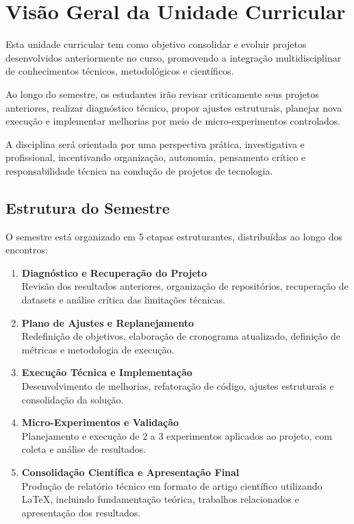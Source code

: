 \section{Visão Geral da Unidade Curricular}

Esta unidade curricular tem como objetivo consolidar e evoluir projetos desenvolvidos anteriormente no curso, promovendo a integração multidisciplinar de conhecimentos técnicos, metodológicos e científicos.

Ao longo do semestre, os estudantes irão revisar criticamente seus projetos anteriores, realizar diagnóstico técnico, propor ajustes estruturais, planejar nova execução e implementar melhorias por meio de micro-experimentos controlados.

A disciplina será orientada por uma perspectiva prática, investigativa e profissional, incentivando organização, autonomia, pensamento crítico e responsabilidade técnica na condução de projetos de tecnologia.

\subsection*{Estrutura do Semestre}

O semestre está organizado em 5 etapas estruturantes, distribuídas ao longo dos encontros:

\begin{enumerate}
    \item \textbf{Diagnóstico e Recuperação do Projeto} \\
    Revisão dos resultados anteriores, organização de repositórios, recuperação de datasets e análise crítica das limitações técnicas.

    \item \textbf{Plano de Ajustes e Replanejamento} \\
    Redefinição de objetivos, elaboração de cronograma atualizado, definição de métricas e metodologia de execução.

    \item \textbf{Execução Técnica e Implementação} \\
    Desenvolvimento de melhorias, refatoração de código, ajustes estruturais e consolidação da solução.

    \item \textbf{Micro-Experimentos e Validação} \\
    Planejamento e execução de 2 a 3 experimentos aplicados ao projeto, com coleta e análise de resultados.

    \item \textbf{Consolidação Científica e Apresentação Final} \\
    Produção de relatório técnico em formato de artigo científico utilizando \LaTeX{}, incluindo fundamentação teórica, trabalhos relacionados e apresentação dos resultados.
\end{enumerate}


